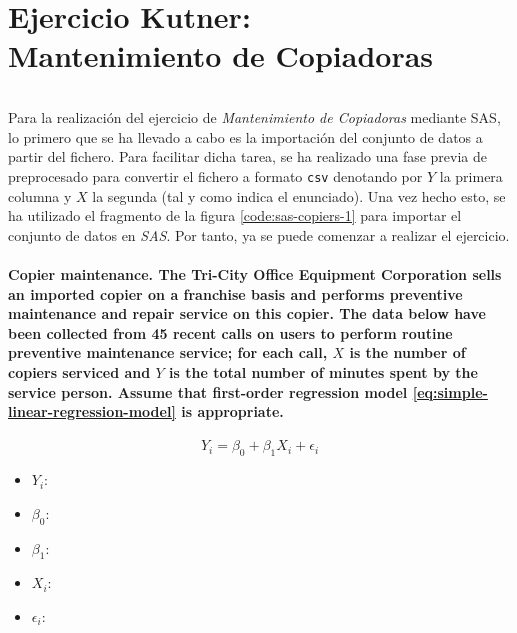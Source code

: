 \documentclass{article}
\begin{document}
  \maketitle


  \part{Ejercicio Kutner:\\ Mantenimiento de Copiadoras}

    \paragraph{}
    Para la realización del ejercicio de \emph{Mantenimiento de Copiadoras} mediante SAS, lo primero que se ha llevado a cabo es la importación del conjunto de datos a partir del fichero. Para facilitar dicha tarea, se ha realizado una fase previa de preprocesado para convertir el fichero a formato \texttt{csv} denotando por $Y$ la primera columna y $X$ la segunda (tal y como indica el enunciado). Una vez hecho esto, se ha utilizado el fragmento de la figura \ref{code:sas-copiers-1} para importar el conjunto de datos en \emph{SAS}. Por tanto, ya se puede comenzar a realizar el ejercicio.

    \setcounter{section}{1}
    \setcounter{subsection}{19}
    \subsection{\textbf{Copier maintenance}. The Tri-City Office Equipment Corporation sells an imported copier on a franchise basis and performs preventive maintenance and repair service on this copier. The data below have been collected from 45 recent calls on users to perform routine preventive maintenance service; for each call, $X$ is the number of copiers serviced and $Y$ is the total number of minutes spent by the service person. Assume that first-order regression model \eqref{eq:simple-linear-regression-model} is appropriate.}
    \label{sec:e1-20}

      \begin{equation}
      \label{eq:simple-linear-regression-model}
        Y_i = \beta_0 + \beta_1X_i + \epsilon_i
      \end{equation}

      \begin{itemize}
        \item $Y_i$:
        \item $\beta_0$:
        \item $\beta_1$:
        \item $X_i$:
        \item $\epsilon_i$:
      \end{itemize}
\end{document}
